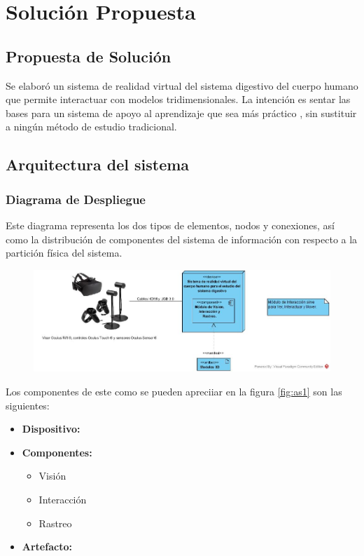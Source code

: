 \chapter{Solución Propuesta}

\section{Propuesta de Solución}
Se elaboró un sistema de realidad virtual del sistema digestivo del cuerpo humano que permite interactuar con modelos tridimensionales.
 La intención es sentar las bases para un sistema de apoyo al aprendizaje que sea más práctico \cite{moore1995learning}, 
 sin sustituir a ningún método de estudio tradicional.\\

\section{Arquitectura del sistema}

\subsection{Diagrama de Despliegue}
Este diagrama representa los dos tipos de elementos, nodos y conexiones, así como la distribución de componentes del sistema 
de información con respecto a la partición física del sistema.\\
\begin{figure}[H]
	\begin{center}
 		\includegraphics[width = .5\textwidth]{v3/images/cu2.jpg}
	\end{center} 
\end{figure}
Los componentes de este como se pueden apreciiar en la figura \ref{fig:as1} son las siguientes:
\begin{itemize}
  \item \textbf{Dispositivo:}
  \item \textbf{Componentes:}
  \begin{itemize}
    \item Visión
    \item Interacción
    \item Rastreo  
  \end{itemize}
  \item \textbf{Artefacto:}
\end{itemize}

